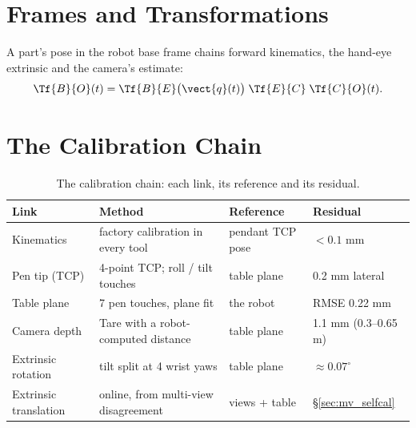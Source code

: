 \section{Frames and Transformations}
\label{sec:sys_frames}
A part's pose in the robot base frame chains forward kinematics, the hand-eye extrinsic
and the camera's estimate:
\begin{equation}
\Tf{B}{O}(t) = \Tf{B}{E}\big(\vect{q}(t)\big)\;\Tf{E}{C}\;\Tf{C}{O}(t).
\label{eq:frame_chain}
\end{equation}

\section{The Calibration Chain}
\label{sec:sys_calibration}
\begin{table}[htbp]
\caption{The calibration chain: each link, its reference and its residual.}
\label{tab:calib_chain}
\centering\small
\begin{tabular}{@{}llll@{}}
\toprule
Link & Method & Reference & Residual \\
\midrule
Kinematics & factory calibration in every tool & pendant TCP pose & $<0.1$ mm \\
Pen tip (TCP) & 4-point TCP; roll / tilt touches & table plane & 0.2 mm lateral \\
Table plane & 7 pen touches, plane fit & the robot & RMSE 0.22 mm \\
Camera depth & Tare with a robot-computed distance & table plane & 1.1 mm (0.3--0.65 m) \\
Extrinsic rotation & tilt split at 4 wrist yaws & table plane & $\approx 0.07^\circ$ \\
Extrinsic translation & online, from multi-view disagreement & views + table & \S\ref{sec:mv_selfcal} \\
\bottomrule
\end{tabular}
\end{table}

